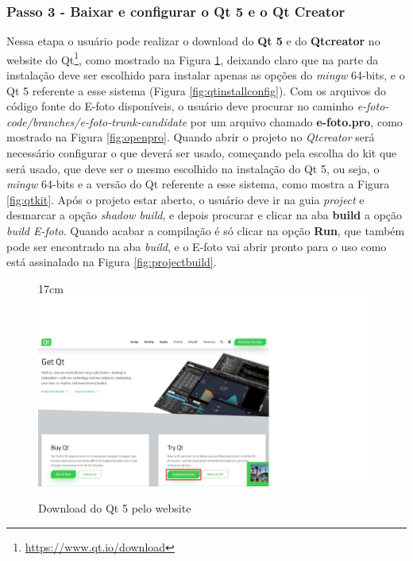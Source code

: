 \subsubsection{Passo 3 - Baixar e configurar o Qt 5 e o Qt Creator}
Nessa etapa o usuário pode realizar o download do \textbf{Qt 5} e do \textbf{Qtcreator} no website do Qt\footnote{\url{https://www.qt.io/download}}, como mostrado na Figura \ref{fig:downqt}, deixando claro que na parte da instalação deve ser escolhido para instalar apenas as opções do \textit{mingw} 64-bits, e o Qt 5 referente a esse sistema (Figura \ref{fig:qtinstallconfig}). Com os arquivos do código fonte do E-foto disponíveis, o usuário deve procurar no caminho \textit{e-foto-code/branches/e-foto-trunk-candidate} por um arquivo chamado \textbf{e-foto.pro}, como mostrado na Figura \ref{fig:openpro}. Quando abrir o projeto no \textit{Qtcreator} será necessário configurar o que deverá ser usado, começando pela escolha do kit que será usado, que deve ser o mesmo escolhido na instalação do Qt 5, ou seja, o \textit{mingw} 64-bits e a versão do Qt referente a esse sistema, como mostra a Figura \ref{fig:qtkit}. Após o projeto estar aberto, o usuário deve ir na guia \textit{project} e desmarcar a opção \textit{shadow build}, e depois procurar e clicar na aba \textbf{build} a opção \textit{build E-foto}. Quando acabar a compilação é só clicar na opção \textbf{Run}, que também pode ser encontrado na aba \textit{build}, e o E-foto vai abrir pronto para o uso como está assinalado na Figura \ref{fig:projectbuild}.
\begin{figure}[!ht]{17cm}
  	\centering
 	\includegraphics[width=12cm]{Figuras/downqt.jpg}
 	\caption{Download do Qt 5 pelo website} \label{fig:downqt}
\end{figure}

